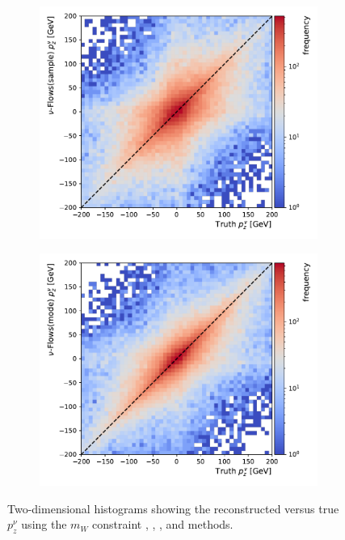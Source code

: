 \begin{figure}[ht]
    \begin{subfigure}{0.40\textwidth}
        \includegraphics[width=\textwidth]{Figures/neutrino_unfolding/p_z_sample.pdf}
        \caption{} \label{fig:pz_dist}
    \end{subfigure}
    \begin{subfigure}{0.40\textwidth}
        \includegraphics[width=\textwidth]{Figures/neutrino_unfolding/p_z_mode.pdf}
        \caption{} \label{fig:E_dist}
    \end{subfigure}
    \caption{Two-dimensional histograms showing the reconstructed versus true $p_z^\nu$ using the $m_W$ constraint , \nuff{} , \nusample{} , and \numode{}  methods.}
    \label{fig:dists}
\end{figure}

